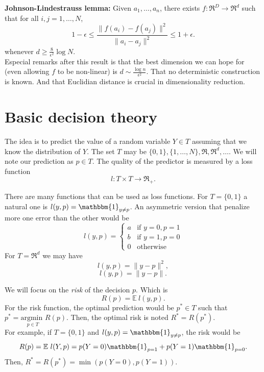 \documentclass[11pt, english]{article}
\begin{document}
\textbf{Johnson-Lindestrauss lemma:}
Given $a_1,\dots,a_n$, there exists $f:\Re^D\rightarrow\Re^d$ such that for all $i,j=1,\dots,N$, 
\begin{equation}
	1-\epsilon\leq\frac{\| f(a_i)-f(a_j)\|^2}{\|a_i-a_j\|^2}\leq 1+\epsilon.
\end{equation}
whenever $d\geq \frac{8}{\epsilon^2}\log N$.\\

Especial remarks after this result is that the best dimension we can hope for (even allowing $f$ to be non-linear) is $d\sim\frac{\log n}{\epsilon^2}$. That no deterministic construction is known. And that Euclidian distance is crucial in dimensionality reduction.


\section{Basic decision theory}

The idea is to predict the value of a random variable $Y\in T$ assuming that we know the distribution of $Y$. The set $ T$ may be $\{0,1\},\{1,\dots,N\},\Re,\Re^d,\dots$. We will note our prediction as $p\in T$. The quality of the predictor is measured by a loss function
$$l: T\times T\rightarrow\Re_{+}.$$

There are many functions that can be used as loss functions. For $ T=\{0,1\}$ a natural one is $l(y,p)=\mathbbm{1}_{y\neq p}$. An asymmetric version that penalize more one error than the other would be
$$l(y,p)=\left\{\begin{array}{ll}
a & \text{if } y=0,p=1\\
b & \text{if } y=1,p=0\\
0 & \text{otherwise}
\end{array}\right.$$
For $ T=\Re^d$ we may have 
$$l(y,p)=\|y-p\|^2,$$
$$l(y,p)=\|y-p\|.$$

We will focus on the \textit{risk} of the decision $p$. Which is
\begin{equation}
	R(p)=\mathbb{E}\ l(y,p).
\end{equation}
For the risk function, the optimal prediction would be $p^*\in T$ such that $p^*=\underset{p\in T}{\text{argmin }}R(p)$. Then, the optimal risk is noted $R^*=R(p^*)$.\\

For example, if $ T=\{0,1\}$ and $l(y,p)=\mathbbm{1}_{y\neq p}$, the risk would be 
\begin{equation}
	R(p)=\mathbb{E}\ l(Y,p)=p(Y=0)\mathbbm{1}_{p=1}+p(Y=1)\mathbbm{1}_{p=0}.
\end{equation}
Then, $R^*=R(p^*)=\min(p(Y=0),p(Y=1))$.\\
\end{document}
